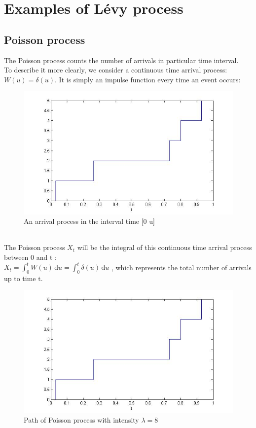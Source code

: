 \documentclass[12pt]{report}
\begin{document}
\section{Examples of Lévy process }
\subsection{Poisson process}
The Poisson process counts the number of arrivals in particular time interval.\\
To describe it more clearly, we consider a continuous time arrival process: $ W(u)=\delta(u)$. It is simply an impulse function
 every time an event occurs:
\begin{figure}[h]

\centering
\includegraphics[scale=1]{poisson.jpg} 
\caption{An arrival process in the interval time [0 u]}
\end{figure}
\\
The Poisson process $X_t$ will be the integral of this continuous time arrival process between 0 and t :\\
$X_t=\displaystyle \int_{0}^{t} W(u) \, \mathrm{d}u=\displaystyle \int_{0}^{t} \delta(u) \, \mathrm{d}u$ , which represents the total number of arrivals up to  time t.\\

\begin{figure}[h]

\centering
\includegraphics[scale=0.7]{poisson.jpg} 
\caption{Path of Poisson process with intensity $\lambda = 8$}
\end{figure}
\end{document}
